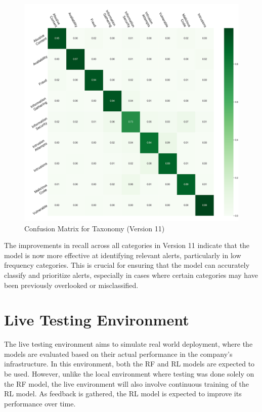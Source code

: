 \begin{figure}[h!]
    \centering
    \includegraphics[width=\textwidth]{ch4/assets/v11_confusion_taxonomy.png}
    \caption{Confusion Matrix for Taxonomy (Version 11)}
    \label{fig:confusion_taxonomy_v11}
\end{figure}

The improvements in recall across all categories in Version 11 indicate that the model is now more effective at identifying relevant alerts, particularly in low frequency categories.
This is crucial for ensuring that the model can accurately classify and prioritize alerts, especially in cases where certain categories may have been previously overlooked or misclassified.

\section{Live Testing Environment}

The live testing environment aims to simulate real world deployment, where the models are evaluated based on their actual performance in the company's infrastructure. 
In this environment, both the RF and RL models are expected to be used. 
However, unlike the local environment where testing was done solely on the RF model, the live environment will also involve continuous training of the RL model. 
As feedback is gathered, the RL model is expected to improve its performance over time.

